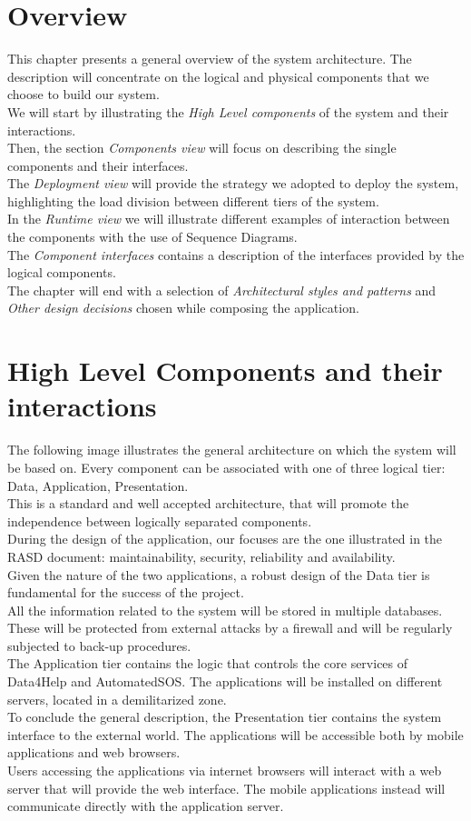\section{Overview}
This chapter presents a general overview of the system architecture.
The description will concentrate on the logical and physical components that
we choose to build our system. \\
We will start by illustrating the \textit{High Level components} of the system and their interactions. \\
Then, the section \textit{Components view} will focus on describing the single components and their interfaces. \\
The \textit{Deployment view} will provide the strategy we adopted to deploy the system, highlighting the load division between different tiers of the system. \\
In the \textit{Runtime view} we will illustrate different examples of interaction between the components with the use of Sequence Diagrams. \\
The \textit{Component interfaces} contains a description of the interfaces provided by the logical components. \\
The chapter will end with a selection of \textit{Architectural styles and patterns} and \textit{Other design decisions} chosen while composing the application.
\clearpage
\section{High Level Components and their interactions}
The following image illustrates the general architecture on which the system will be based on. Every component can be associated with one of three logical tier: Data, Application, Presentation. \\
This is a standard and well accepted architecture, that will promote the independence between logically separated components. \\
During the design of the application, our focuses are the one illustrated in the RASD document: maintainability, security, reliability and availability. \\
Given the nature of the two applications, a robust design of the Data tier is fundamental for the success of the project. \\
All the information related to the system will be stored in multiple databases. These will be protected from external attacks by a firewall and will be regularly subjected to back-up procedures. \\
The Application tier contains the logic that controls the core services of Data4Help and AutomatedSOS. The applications will be installed on different servers, located in a demilitarized zone. \\
To conclude the general description, the Presentation tier contains the system interface to the external world. The applications will be accessible both by mobile applications and web browsers. \\
Users accessing the applications via internet browsers will interact with a web server that will provide the web interface. The mobile applications instead will communicate directly with the application server. \\

